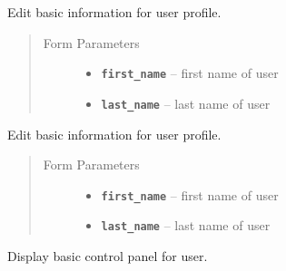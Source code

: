 \documentclass[letterpaper,10pt,english]{sphinxmanual}
\begin{document}
\begin{fulllineitems}
\label{users:get--user-edit-profile-about}
Edit basic information for user profile.
\begin{quote}\begin{description}
\item[{Form Parameters}] \leavevmode\begin{itemize}
\item {} 
\textbf{\texttt{first\_name}} -- first name of user

\item {} 
\textbf{\texttt{last\_name}} -- last name of user

\end{itemize}

\end{description}\end{quote}

\end{fulllineitems}



\begin{fulllineitems}
\label{users:post--user-edit-profile-about}
Edit basic information for user profile.
\begin{quote}\begin{description}
\item[{Form Parameters}] \leavevmode\begin{itemize}
\item {} 
\textbf{\texttt{first\_name}} -- first name of user

\item {} 
\textbf{\texttt{last\_name}} -- last name of user

\end{itemize}

\end{description}\end{quote}

\end{fulllineitems}



\begin{fulllineitems}
\label{users:get--user-control-panel}
Display basic control panel for user.

\end{fulllineitems}
\end{document}
